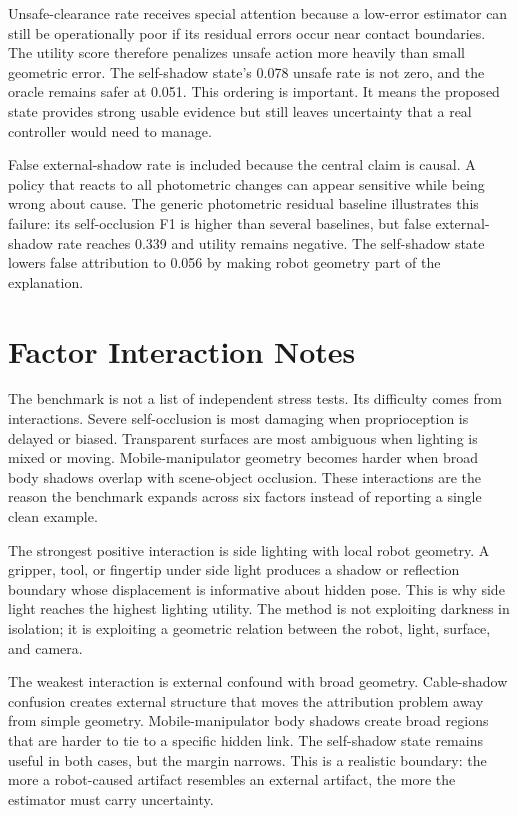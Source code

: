 \documentclass{article}
\begin{document}
Unsafe-clearance rate receives special attention because a low-error estimator can still be operationally poor if its residual errors occur near contact boundaries. The utility score therefore penalizes unsafe action more heavily than small geometric error. The self-shadow state's 0.078 unsafe rate is not zero, and the oracle remains safer at 0.051. This ordering is important. It means the proposed state provides strong usable evidence but still leaves uncertainty that a real controller would need to manage.

False external-shadow rate is included because the central claim is causal. A policy that reacts to all photometric changes can appear sensitive while being wrong about cause. The generic photometric residual baseline illustrates this failure: its self-occlusion F1 is higher than several baselines, but false external-shadow rate reaches 0.339 and utility remains negative. The self-shadow state lowers false attribution to 0.056 by making robot geometry part of the explanation.

\clearpage
\section{Factor Interaction Notes}

The benchmark is not a list of independent stress tests. Its difficulty comes from interactions. Severe self-occlusion is most damaging when proprioception is delayed or biased. Transparent surfaces are most ambiguous when lighting is mixed or moving. Mobile-manipulator geometry becomes harder when broad body shadows overlap with scene-object occlusion. These interactions are the reason the benchmark expands across six factors instead of reporting a single clean example.

The strongest positive interaction is side lighting with local robot geometry. A gripper, tool, or fingertip under side light produces a shadow or reflection boundary whose displacement is informative about hidden pose. This is why side light reaches the highest lighting utility. The method is not exploiting darkness in isolation; it is exploiting a geometric relation between the robot, light, surface, and camera.

The weakest interaction is external confound with broad geometry. Cable-shadow confusion creates external structure that moves the attribution problem away from simple geometry. Mobile-manipulator body shadows create broad regions that are harder to tie to a specific hidden link. The self-shadow state remains useful in both cases, but the margin narrows. This is a realistic boundary: the more a robot-caused artifact resembles an external artifact, the more the estimator must carry uncertainty.
\end{document}
